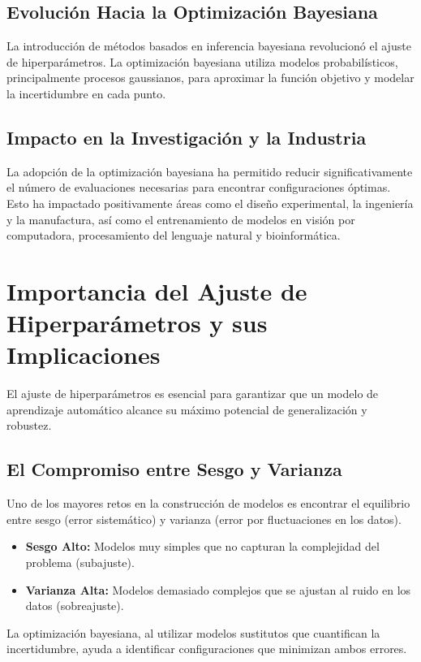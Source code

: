 \documentclass[12pt]{article}
\begin{document}
	\subsection{Evolución Hacia la Optimización Bayesiana}
	La introducción de métodos basados en inferencia bayesiana revolucionó el ajuste de hiperparámetros. La optimización bayesiana utiliza modelos probabilísticos, principalmente procesos gaussianos, para aproximar la función objetivo y modelar la incertidumbre en cada punto.  
	\lipsum[3-4]
	
	\subsection{Impacto en la Investigación y la Industria}
	La adopción de la optimización bayesiana ha permitido reducir significativamente el número de evaluaciones necesarias para encontrar configuraciones óptimas. Esto ha impactado positivamente áreas como el diseño experimental, la ingeniería y la manufactura, así como el entrenamiento de modelos en visión por computadora, procesamiento del lenguaje natural y bioinformática.  
	\lipsum[5]
	
	\section{Importancia del Ajuste de Hiperparámetros y sus Implicaciones}
	El ajuste de hiperparámetros es esencial para garantizar que un modelo de aprendizaje automático alcance su máximo potencial de generalización y robustez.
	
	\subsection{El Compromiso entre Sesgo y Varianza}
	Uno de los mayores retos en la construcción de modelos es encontrar el equilibrio entre sesgo (error sistemático) y varianza (error por fluctuaciones en los datos).  
	\begin{itemize}[leftmargin=1.5cm]
		\item \textbf{Sesgo Alto:} Modelos muy simples que no capturan la complejidad del problema (subajuste).
		\item \textbf{Varianza Alta:} Modelos demasiado complejos que se ajustan al ruido en los datos (sobreajuste).
	\end{itemize}
	La optimización bayesiana, al utilizar modelos sustitutos que cuantifican la incertidumbre, ayuda a identificar configuraciones que minimizan ambos errores.  
	\lipsum[6]
	
\end{document}
